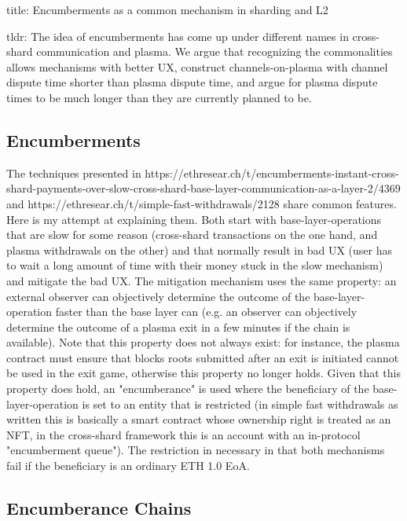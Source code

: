 \documentclass{article}
\begin{document}
title: Encumberments as a common mechanism in sharding and L2

tldr: The idea of encumberments has come up under different names in cross-shard communication and plasma. We argue that recognizing the commonalities allows mechanisms with better UX, construct channels-on-plasma with channel dispute time shorter than plasma dispute time, and argue for plasma dispute times to be much longer than they are currently planned to be.

\subsection*{Encumberments}

The techniques presented in https://ethresear.ch/t/encumberments-instant-cross-shard-payments-over-slow-cross-shard-base-layer-communication-as-a-layer-2/4369 and https://ethresear.ch/t/simple-fast-withdrawals/2128 share common features. Here is my attempt at explaining them. Both start with base-layer-operations that are slow for some reason (cross-shard transactions on the one hand, and plasma withdrawals on the other) and that normally result in bad UX (user has to wait a long amount of time with their money stuck in the slow mechanism) and mitigate the bad UX. The mitigation mechanism uses the same property: an external observer can objectively determine the outcome of the base-layer-operation faster than the base layer can (e.g. an observer can objectively determine the outcome of a plasma exit in a few minutes if the chain is available). Note that this property does not always exist: for instance, the plasma contract must ensure that blocks roots submitted after an exit is initiated cannot be used in the exit game, otherwise this property no longer holds. Given that this property does hold, an "encumberance" is used where the beneficiary of the base-layer-operation is set to an entity that is restricted (in simple fast withdrawals as written this is basically a smart contract whose ownership right is treated as an NFT, in the cross-shard framework this is an account with an in-protocol "encumberment queue"). The restriction in necessary in that both mechanisms fail if the beneficiary is an ordinary ETH 1.0 EoA.

\subsection*{Encumberance Chains}
\end{document}
